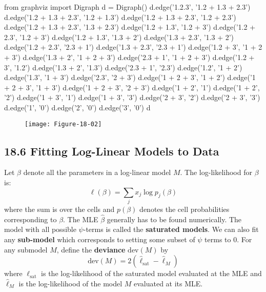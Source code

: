 \begin{python}
from graphviz import Digraph
d = Digraph()
d.edge('1.2.3', '1.2 + 1.3 + 2.3')
d.edge('1.2 + 1.3 + 2.3', '1.2 + 1.3')
d.edge('1.2 + 1.3 + 2.3', '1.2 + 2.3')
d.edge('1.2 + 1.3 + 2.3', '1.3 + 2.3')
d.edge('1.2 + 1.3', '1.2 + 3')
d.edge('1.2 + 2.3', '1.2 + 3')
d.edge('1.2 + 1.3', '1.3 + 2')
d.edge('1.3 + 2.3', '1.3 + 2')
d.edge('1.2 + 2.3', '2.3 + 1')
d.edge('1.3 + 2.3', '2.3 + 1')
d.edge('1.2 + 3', '1 + 2 + 3')
d.edge('1.3 + 2', '1 + 2 + 3')
d.edge('2.3 + 1', '1 + 2 + 3')
d.edge('1.2 + 3', '1.2')
d.edge('1.3 + 2', '1.3')
d.edge('2.3 + 1', '2.3')
d.edge('1.2', '1 + 2')
d.edge('1.3', '1 + 3')
d.edge('2.3', '2 + 3')
d.edge('1 + 2 + 3', '1 + 2')
d.edge('1 + 2 + 3', '1 + 3')
d.edge('1 + 2 + 3', '2 + 3')
d.edge('1 + 2', '1')
d.edge('1 + 2', '2')
d.edge('1 + 3', '1')
d.edge('1 + 3', '3')
d.edge('2 + 3', '2')
d.edge('2 + 3', '3')
d.edge('1', '0')
d.edge('2', '0')
d.edge('3', '0')
d
\end{python}

\begin{figure}[H]
\centering
\texttt{[image: Figure-18-02]}
\end{figure}


\subsection*{18.6 Fitting Log-Linear Models to Data}\label{fitting-log-linear-models-to-data}
Let \(\beta\) denote all the parameters in a log-linear model \(M\). The log-likelihood for \(\beta\) is:
\[
\ell(\beta) = \sum_{j} x_{j} \log p_{j}(\beta)
\]
where the sum is over the cells and \(p(\beta)\) denotes the cell probabilities corresponding to \(\beta\). The MLE \(\hat{\beta}\) generally has to be found numerically. The model with all possible \(\psi\)-terms is called the \textbf{saturated models}. We can also fit any \textbf{sub-model} which corresponds to setting some subset of \(\psi\) terms to 0.
For any submodel \(M\), define the \textbf{deviance} \(\text{dev}(M)\) by
\[
\text{dev}(M) = 2 (\hat{\ell}_\text{sat} - \hat{\ell}_M)
\]
where \(\ell_\text{sat}\) is the log-likelihood of the saturated model evaluated at the MLE and \(\hat{\ell}_M\) is the log-likelihood of the model \(M\) evaluated at its MLE.

